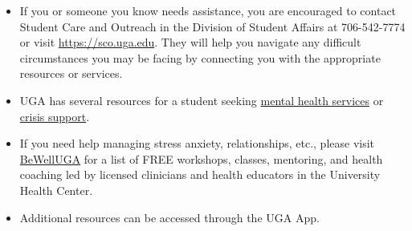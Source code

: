 \documentclass[11pt, letterpaper]{article}
\begin{document}
\begin{itemize}
\item If you or someone you know needs assistance, you are encouraged to contact Student Care and Outreach in the Division of Student Affairs at 706-542-7774 or visit \href{https://sco.uga.edu}{https://sco.uga.edu}. They will help you navigate any difficult circumstances you may be facing by connecting you with the appropriate resources or services. 
\item UGA has several resources for a student seeking \href{https://www.uhs.uga.edu/bewelluga/bewelluga}{mental health services} or \href{https://www.uhs.uga.edu/info/emergencies}{crisis support}. 
\item If you need help managing stress anxiety, relationships, etc., please visit \href{https://www.uhs.uga.edu/bewelluga/bewelluga}{BeWellUGA} for a list of FREE workshops, classes, mentoring, and health coaching led by licensed clinicians and health educators in the University Health Center.
\item Additional resources can be accessed through the UGA App.
\end{itemize}



\end{document}
